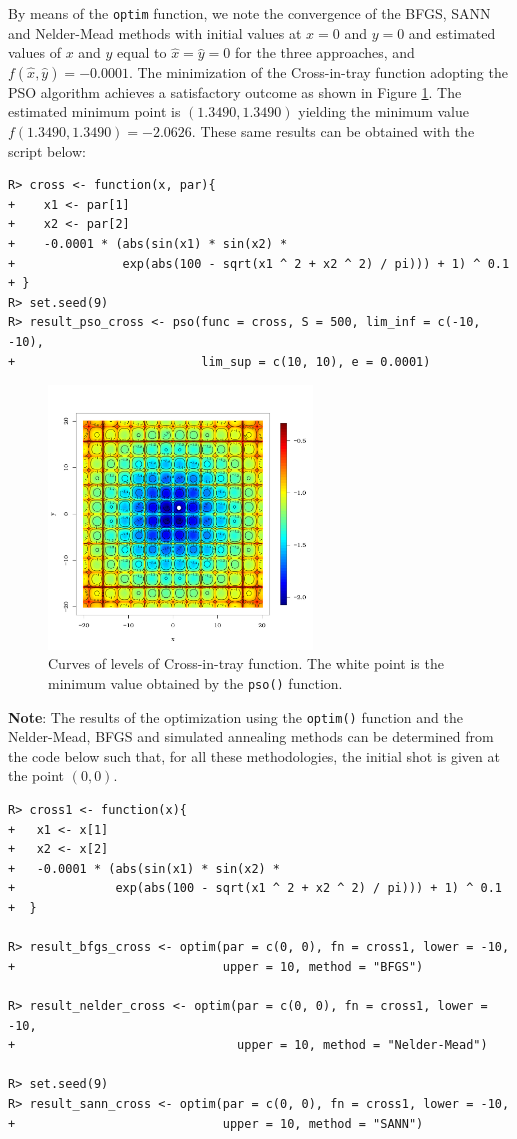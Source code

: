 \documentclass[10pt,letterpaper]{article}
\begin{document}
By means of the \texttt{optim} function, we note the convergence of the BFGS, SANN and Nelder-Mead methods with initial values at $x=0$ and $y=0$
and estimated values of $x$ and $y$ equal to $\hat{x}=\hat{y}=0$ for the three approaches,
and $f(\hat{x},\hat{y})=-0.0001$. The minimization of the Cross-in-tray function adopting the PSO algorithm achieves a satisfactory outcome as shown in Figure \ref{curves_cross}. The estimated minimum point is $(1.3490,1.3490)$ yielding the minimum value $f(1.3490,1.3490) = -2.0626$. These same results can be obtained with the script below:
\begin{verbatim}
R> cross <- function(x, par){
+    x1 <- par[1]
+    x2 <- par[2]
+    -0.0001 * (abs(sin(x1) * sin(x2) * 
+               exp(abs(100 - sqrt(x1 ^ 2 + x2 ^ 2) / pi))) + 1) ^ 0.1
+ }
R> set.seed(9)
R> result_pso_cross <- pso(func = cross, S = 500, lim_inf = c(-10, -10),
+                          lim_sup = c(10, 10), e = 0.0001)
\end{verbatim}
\begin{figure}[H]
\centering
\includegraphics[width=7cm,height=7cm]{curve_cross}
\caption{Curves of levels of Cross-in-tray function. The white point is the minimum value obtained by the \texttt{pso()} function.}
\label{curves_cross}
\end{figure}
\noindent \textbf{Note}: The results of the optimization using the \texttt{optim()} function and the Nelder-Mead, BFGS and simulated annealing
methods can be determined from the code below such that, for all these methodologies, the initial shot is given at the point $(0,0)$.
\begin{verbatim}
R> cross1 <- function(x){
+   x1 <- x[1]
+   x2 <- x[2]
+   -0.0001 * (abs(sin(x1) * sin(x2) * 
+              exp(abs(100 - sqrt(x1 ^ 2 + x2 ^ 2) / pi))) + 1) ^ 0.1
+  }

R> result_bfgs_cross <- optim(par = c(0, 0), fn = cross1, lower = -10,
+                             upper = 10, method = "BFGS")

R> result_nelder_cross <- optim(par = c(0, 0), fn = cross1, lower = -10,
+                               upper = 10, method = "Nelder-Mead")

R> set.seed(9)
R> result_sann_cross <- optim(par = c(0, 0), fn = cross1, lower = -10,
+                             upper = 10, method = "SANN")
\end{verbatim}
\end{document}
